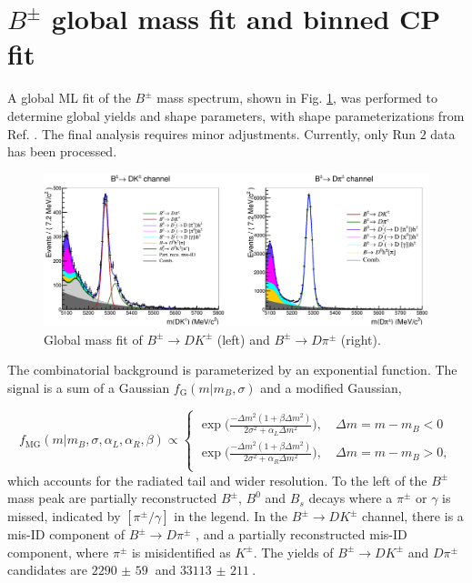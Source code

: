 \documentclass[12pt, a4paper, notitlepage, onecolumn]{article}
\begin{document}
\section{\texorpdfstring{$B^\pm$}{B} global mass fit and binned CP fit}
\noindent A global ML fit of the $B^\pm$ mass spectrum, shown in Fig. \ref{fig_Bmass_Global}, was performed to determine global yields and shape parameters, with shape parameterizations from Ref. \cite{cite_LHCbGGSZKSpipi}. The final analysis requires minor adjustments. Currently, only Run $2$ data has been processed.

\begin{figure}[H] 
  \centering
  \includegraphics[width=1\textwidth]{Plots/GlobalFit.png}
  \caption{Global mass fit of $B^\pm\to DK^\pm$ (left) and $B^\pm\to D\pi^\pm$ (right).}
  \label{fig_Bmass_Global}
\end{figure}

The combinatorial background is parameterized by an exponential function. The signal is a sum of a Gaussian $f_\text{G}(m|m_B, \sigma)$ and a modified Gaussian,

\begin{equation}
  f_\text{MG}(m|m_B, \sigma, \alpha_L, \alpha_R, \beta)\propto
  \begin{cases}
    \exp\Big(\frac{-\Delta m^2(1 + \beta\Delta m^2)}{2\sigma^2 + \alpha_L\Delta m^2}\Big), \quad \Delta m = m - m_B < 0 \\
    \exp\Big(\frac{-\Delta m^2(1 + \beta\Delta m^2)}{2\sigma^2 + \alpha_R\Delta m^2}\Big), \quad \Delta m = m - m_B > 0, \\
  \end{cases}
\end{equation}
which accounts for the radiated tail and wider resolution. To the left of the $B^\pm$ mass peak are partially reconstructed $B^\pm$, $B^0$ and $B_s$ decays where a $\pi^\pm$ or $\gamma$ is missed, indicated by $[\pi^\pm/\gamma]$ in the legend. In the $B^\pm\to DK^\pm$ channel, there is a mis-ID component of $B^\pm\to D\pi^\pm$ , and a partially reconstructed mis-ID component, where $\pi^\pm$ is misidentified as $K^\pm$. The yields of $B^\pm\to DK^\pm$ and $D\pi^\pm$ candidates are $\SI{2290(59)}{}$ and $\SI{33113(211)}{}$.
\end{document}
